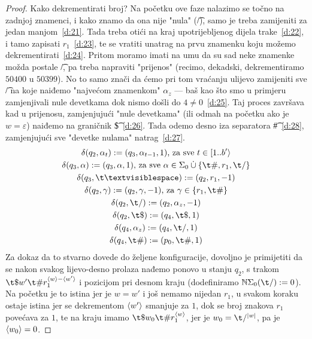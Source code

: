 \begin{proof}
Kako dekrementirati broj? Na početku ove faze nalazimo se točno na zadnjoj znamenci, i kako znamo da ona nije "nula" (\t/), samo je treba zamijeniti za jedan manjom~\eqref{d:21}. Tada treba otići na kraj upotrijebljenog dijela trake~\eqref{d:22}, i tamo zapisati $r_1$~\eqref{d:23}, te se vratiti unatrag na prvu znamenku koju možemo dekrementirati~\eqref{d:24}. Pritom moramo imati na umu da su sad neke znamenke možda postale \t/, pa treba napraviti "prijenos" (recimo, dekadski, dekrementiramo $50400$ u $50399$). No to samo znači da ćemo pri tom vraćanju ulijevo zamijeniti sve \t/ na koje naiđemo "najvećom znamenkom" $\alpha_z$ --- baš kao što smo u primjeru zamjenjivali nule devetkama dok nismo došli do $4\not=0$~\eqref{d:25}. Taj proces završava kad u prijenosu, zamjenjujući "nule devetkama" (ili odmah na početku ako je $w=\varepsilon$) naiđemo na graničnik \t\$~\eqref{d:26}. Tada odemo desno iza separatora \t\#~\eqref{d:28}, zamjenjujući sve "devetke nulama" natrag~\eqref{d:27}.
%
\begin{gather}
\label{d:21}
    \delta(q_2,\alpha_t):=(q_3,\alpha_{t-1},1)\text{, za sve }t\in[1..b'\rangle\\
\label{d:22}
    \delta(q_3,\alpha):=(q_3,\alpha,1)\text{, za sve }\alpha\in\Sigma_0\mathbin{\dot\cup}\{\t\#,r_1,\t/\}\\
\label{d:23}
    \delta(q_3,\bl):=(q_2,r_1,-1)\\
\label{d:24}
    \delta(q_2,\gamma):=(q_2,\gamma,-1)\text{, za }\gamma\in\{r_1,\t\#\}\\
\label{d:25}
    \delta(q_2,\t/):=(q_2,\alpha_z,-1)\\
\label{d:26}
    \delta(q_2,\t\$):=(q_4,\t\$,1)\\
\label{d:27}
    \delta(q_4,\alpha_z):=(q_4,\t/,1)\\
\label{d:28}
    \delta(q_4,\t\#):=(p_0,\t\#,1)
\end{gather}
Za dokaz da to stvarno dovede do željene konfiguracije, dovoljno je primijetiti da se nakon svakog lijevo-desno prolaza nađemo ponovo u stanju $q_2$, s trakom $\t\$w'\t\#r_1^{\kr w-\kr{w'}}$ i pozicijom pri desnom kraju (dodefiniramo $\N\Sigma_0(\t/):=0$). Na početku je to istina jer je $w=w'$ i još nemamo nijedan $r_1$, u svakom koraku ostaje istina jer se dekrementom $\langle w'\rangle$ smanjuje za $1$, dok se broj znakova $r_1$ povećava za $1$, te na kraju imamo $\t\$w_0\t\#r_1^{\kr w}$, jer je $w_0=\t/^{\left|w\right|}$, pa je $\langle w_0\rangle=0$.
\end{proof}

